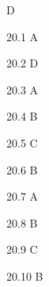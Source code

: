 \begin{Solution}{20}
D
\end{Solution}
\begin{Solution}{20.{1}}
A
\end{Solution}
\begin{Solution}{20.{2}}
D
\end{Solution}
\begin{Solution}{20.{3}}
A
\end{Solution}
\begin{Solution}{20.{4}}
B
\end{Solution}
\begin{Solution}{20.{5}}
C
\end{Solution}
\begin{Solution}{20.{6}}
B
\end{Solution}
\begin{Solution}{20.{7}}
A
\end{Solution}
\begin{Solution}{20.{8}}
B
\end{Solution}
\begin{Solution}{20.{9}}
C
\end{Solution}
\begin{Solution}{20.{10}}
B
\end{Solution}
